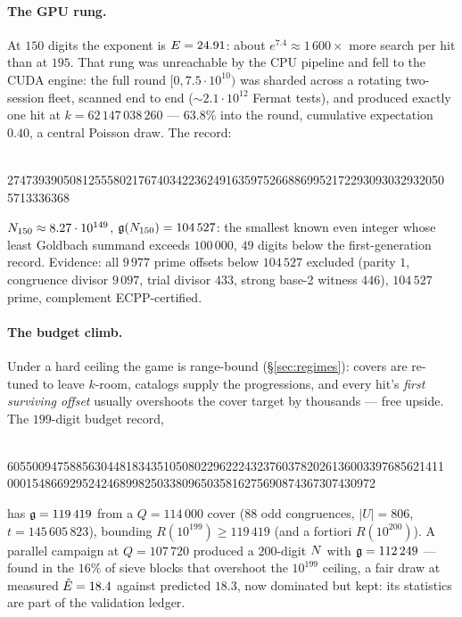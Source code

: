 \paragraph{The GPU rung.} At $150$ digits the exponent is
$E=24.91$: about $e^{7.4}\approx1\,600\times$ more search per hit
than at $195$. That rung was unreachable by the CPU pipeline and fell
to the CUDA engine: the full round $[0,7.5\cdot10^{10})$ was sharded
across a rotating two-session fleet, scanned end to end
($\sim2.1\cdot10^{12}$ Fermat tests), and produced exactly one hit at
$k=62\,147\,038\,260$ --- $63.8\%$ into the round, cumulative
expectation $0.40$, a central Poisson draw. The record:
\begin{center}
\begin{minipage}{0.94\textwidth}\small{}\\
2747393905081255580217674034223624916359752668869952172293093032932050\\
5713336368
\end{minipage}
\end{center}
$N_{150}\approx8.27\cdot10^{149}$, $\mathfrak{g}(N_{150})=104\,527$: the
smallest known even integer whose least Goldbach summand exceeds
$100\,000$, $49$ digits below the first-generation record. Evidence:
all $9\,977$ prime offsets below $104\,527$ excluded (parity $1$,
congruence divisor $9\,097$, trial divisor $433$, strong base-2
witness $446$), $104\,527$ prime, complement ECPP-certified.

\paragraph{The budget climb.} Under a hard ceiling the game is
range-bound (\S\ref{sec:regimes}): covers are re-tuned to leave
$k$-room, catalogs supply the progressions, and every hit's
\emph{first surviving offset} usually overshoots the cover target by
thousands --- free upside. The $199$-digit budget record,
\begin{center}
\begin{minipage}{0.94\textwidth}\small{}\\
6055009475885630448183435105080229622243237603782026136003397685621411\\
00015486692952424689982503380965035816275690874367307430972
\end{minipage}
\end{center}
has $\mathfrak{g}=119\,419$ from a $Q=114\,000$ cover ($88$ odd congruences,
$|U|=806$, $t=145\,605\,823$), bounding $R(10^{199})\ge119\,419$ (and
a fortiori $R(10^{200})$). A parallel campaign at $Q=107\,720$
produced a $200$-digit $N$ with $\mathfrak{g}=112\,249$ --- found in the $16\%$
of sieve blocks that overshoot the $10^{199}$ ceiling, a fair draw at
measured $\hat{E}=18.4$ against predicted $18.3$, now dominated but
kept: its statistics are part of the validation ledger.


